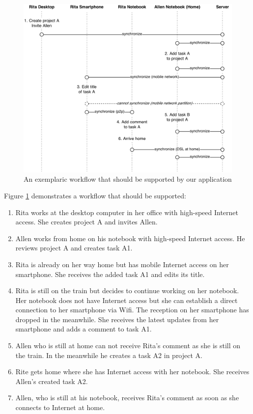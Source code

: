 \begin{figure}[H]
\centering
\includegraphics[width=1.0\textwidth]{img/workflow}
\caption{An exemplaric workflow that should be supported by our application}
\label{fig:scenario.workflow}
\end{figure}

Figure \ref{fig:scenario.workflow} demonstrates a workflow that should be supported:\\

\begin{enumerate}
\item Rita works at the desktop computer in her office with high-speed Internet access. She creates project A and invites Allen.
\item Allen works from home on his notebook with high-speed Internet access. He reviews project A and creates task A1.
\item Rita is already on her way home but has mobile Internet access on her smartphone. She receives the added task A1 and edits its title.
\item Rita is still on the train but decides to continue working on her notebook. Her notebook does not have Internet access but she can establish a direct connection to her smartphone via Wifi. The reception on her smartphone has dropped in the meanwhile. She receives the latest updates from her smartphone and adds a comment to task A1.
\item Allen who is still at home can not receive Rita's comment as she is still on the train. In the meanwhile he creates a task A2 in project A.
\item Rite gets home where she has Internet access with her notebook. She receives Allen's created task A2.
\item Allen, who is still at his notebook, receives Rita's comment as soon as she connects to Internet at home.
\end{enumerate}

